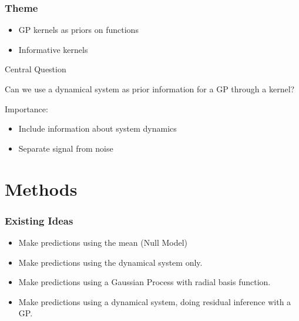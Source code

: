 \documentclass{beamer}
\begin{document}
	
	
	\begin{frame}
		\frametitle{Theme}
		
		\begin{itemize}
			\item GP kernels as priors on functions
			\item Informative kernels
		\end{itemize}
		
		\vspace{1em}
		
		Central Question
		
		Can we use a dynamical system as prior information for a GP through a kernel?
		
		Importance:
		
		\vspace{1em}
		
		\begin{itemize}
			\item Include information about system dynamics
			\item Separate signal from noise
		\end{itemize}
	\end{frame}
	
	\section[Section]{Methods}
	
	\begin{frame}
		\frametitle{Existing Ideas}
		
		\begin{itemize}
			\item Make predictions using the mean (Null Model)
			\item Make predictions using the dynamical system only.
			\item Make predictions using a Gaussian Process with radial basis function.
			\item Make predictions using a dynamical system, doing residual inference with a GP.
		\end{itemize}
		
	\end{frame}
	
\end{document}
